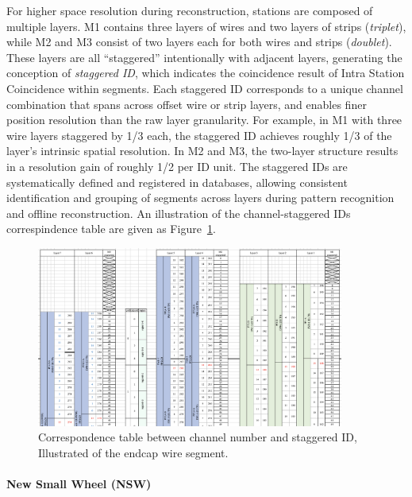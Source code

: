 For higher space resolution during reconstruction, stations are composed of multiple layers. M1 contains three layers of wires and two layers of strips (\textit{triplet}), while M2 and M3 consist of two layers each for both wires and strips (\textit{doublet}). These layers are all ``staggered'' intentionally with adjacent layers, generating the conception of \textit{staggered ID}, which indicates the coincidence result of Intra Station Coincidence within segments. Each staggered ID corresponds to a unique channel combination that spans across offset wire or strip layers, and enables finer position resolution than the raw layer granularity. For example, in M1 with three wire layers staggered by 1/3 each, the staggered ID achieves roughly 1/3 of the layer's intrinsic spatial resolution. In M2 and M3, the two-layer structure results in a resolution gain of roughly 1/2 per ID unit. The staggered IDs are systematically defined and registered in databases, allowing consistent identification and grouping of segments across layers during pattern recognition and offline reconstruction. An illustration of the channel-staggered IDs correspindence table are given as Figure~\ref{fig:staggeredID}.

\begin{figure}[htbp]
  \centering
  \includegraphics[width=0.9\textwidth]{figs/chapter2/staggeredID.png}
  \caption{Correspondence table between channel number and staggered ID, Illustrated of the endcap wire segment.}
  \label{fig:staggeredID}
\end{figure}

\paragraph{New Small Wheel (NSW)} \label{sec:NSW}

